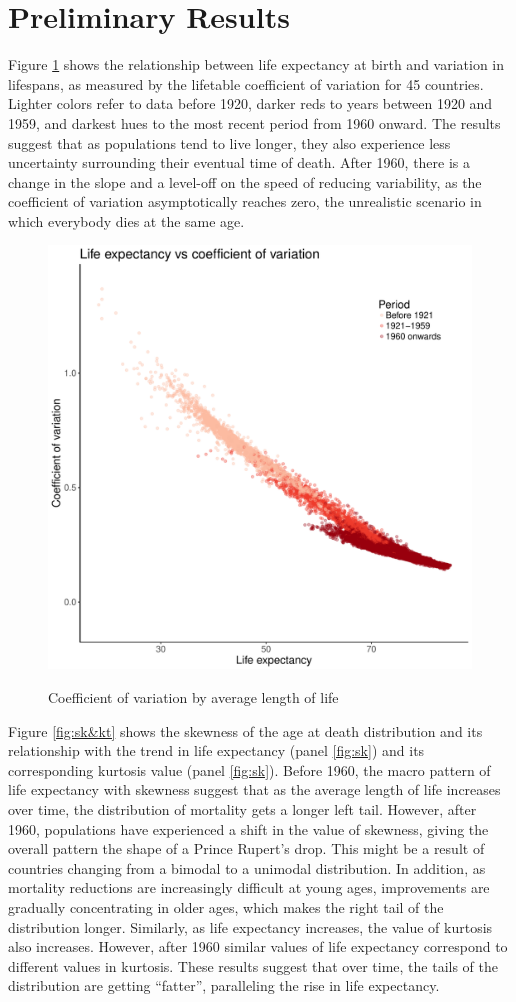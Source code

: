 \documentclass{article}
\begin{document}
\FloatBarrier
\section*{Preliminary Results}
Figure \ref{fig:CV} shows the relationship between life expectancy at birth and 
variation in lifespans, as measured by the lifetable coefficient of variation
for 45 countries. Lighter colors refer to data before 1920, darker reds to years between 1920 and 1959, and darkest hues to the most recent period from 1960 onward. The results suggest that as populations tend to live longer, they also experience less uncertainty surrounding their eventual time of death. After 1960, there is a change in the slope and a level-off on the speed of reducing variability, as the coefficient of variation asymptotically reaches zero, the unrealistic scenario in which everybody dies at the same age.
\begin{figure}
\caption{Coefficient of variation by average length of life}
\centering
\includegraphics[width=.3\textwidth]{Figures/Figure_CV}
\label{fig:CV}
\end{figure}

Figure \ref{fig:sk&kt} shows the skewness of the age at death distribution and
its relationship with the trend in life expectancy (panel \ref{fig:sk}) and
its corresponding kurtosis value (panel \ref{fig:sk}). Before 1960, the macro
pattern of life expectancy with skewness suggest that as the average length of
life increases over time, the distribution of mortality gets a longer left tail.
However, after 1960, populations have experienced a shift in the value
of skewness, giving the overall pattern the shape of a Prince Rupert's drop. This
might be a result of countries changing from a bimodal to a unimodal
distribution. In addition, as mortality reductions are increasingly difficult at
young ages, improvements are gradually concentrating in older ages, which makes
the right tail of the distribution longer. Similarly, as life expectancy increases, the value of kurtosis also increases. However, after 1960 similar values of life expectancy correspond to different values in kurtosis. These results suggest that over time, the tails of the distribution are getting ``fatter'', paralleling the rise in life expectancy.
\end{document}
